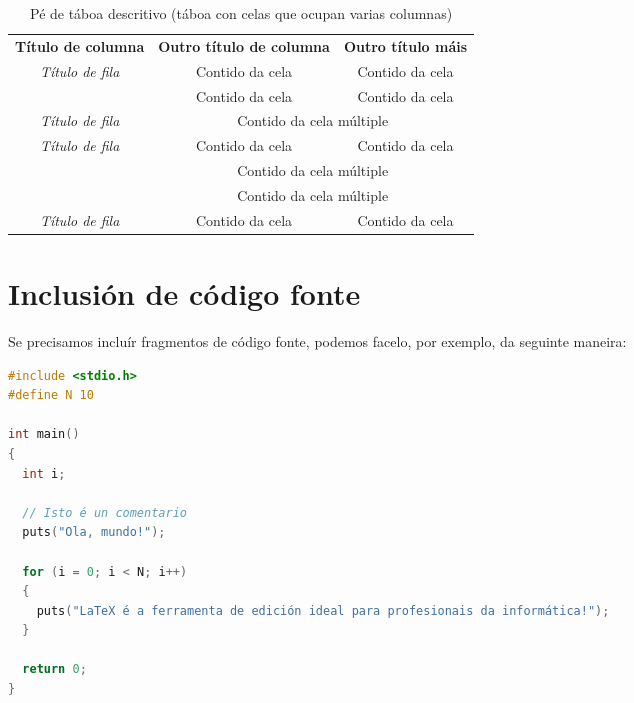 \begin{table}[hp!]
  \centering
  \begin{tabular}{c|c|c}
  \rowcolor{udcpink!25}
  \multicolumn{3}{c}{\textbf{Cela en varias columnas}} \\\hline
  \rowcolor{udcpink!25}
  \textbf{Título de columna}               & \textbf{Outro título de columna}             & \textbf{Outro título máis} \\\hline
  \multirow{2}{*}{\textit{Título de fila}} & \cellcolor{udcgray!25} Contido da cela       & \cellcolor{udcgray!25} Contido da cela \\
                                           & Contido da cela                              & Contido da cela \\
  \rowcolor{udcgray!25}
  \textit{Título de fila}                  & \multicolumn{2}{c}{Contido da cela múltiple} \\
  \multirow{3}{*}{\textit{Título de fila}} & Contido da cela                              & Contido da cela \\
                                           & \multicolumn{2}{c}{\cellcolor{udcgray!25} Contido da cela múltiple} \\
                                           & \multicolumn{2}{c}{Contido da cela múltiple} \\
  \rowcolor{udcgray!25}
  \textit{Título de fila}                  & Contido da cela                              & Contido da cela \\
  \end{tabular}
  \caption{Pé de táboa descritivo (táboa con celas que ocupan varias columnas)}
  \label{tab:exemplofilasecolumnas}
\end{table}

\section{Inclusión de código fonte}

Se precisamos incluír fragmentos de código fonte, podemos facelo, por exemplo, da
seguinte maneira:

\begin{lstlisting}[language=C]
#include <stdio.h>
#define N 10

int main()
{
  int i;

  // Isto é un comentario
  puts("Ola, mundo!");

  for (i = 0; i < N; i++)
  {
    puts("LaTeX é a ferramenta de edición ideal para profesionais da informática!");
  }

  return 0;
}
\end{lstlisting}

